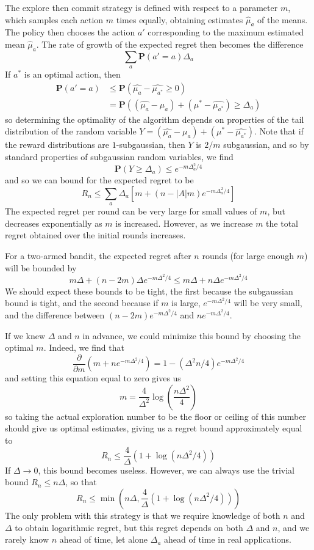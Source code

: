 The explore then commit strategy is defined with respect to a parameter $m$, which samples each action $m$ times equally, obtaining estimates $\widehat{\mu}_a$ of the means. The policy then chooses the action $a'$ corresponding to the maximum estimated mean $\widehat{\mu}_a$. The rate of growth of the expected regret then becomes the difference
%
\[ \sum_a \mathbf{P}(a' = a) \Delta_a \]
%
If $a^*$ is an optimal action, then
%
\begin{align*}
    \mathbf{P}(a' = a) &\leq \mathbf{P}(\widehat{\mu_a} - \widehat{\mu_{a^*}} \geq 0)\\
    &= \mathbf{P}((\widehat{\mu_a} - \mu_a) + (\mu^* - \widehat{\mu_{a^*}}) \geq \Delta_a)
\end{align*}
%
so determining the optimality of the algorithm depends on properties of the tail distribution of the random variable $Y = (\widehat{\mu_a} - \mu_a) + (\mu^* - \widehat{\mu_{a^*}})$. Note that if the reward distributions are $1$-subgaussian, then $Y$ is $2/m$ subgaussian, and so by standard properties of subgaussian random variables, we find
%
\[ \mathbf{P}(Y \geq \Delta_a) \leq e^{-m\Delta_a^2/4} \]
%
and so we can bound for the expected regret to be
%
\[ R_n \leq \sum_a \Delta_a \left[ m + (n - |A|m)e^{-m\Delta_a^2/4} \right] \]
%
The expected regret per round can be very large for small values of $m$, but decreases exponentially as $m$ is increased. However, as we increase $m$ the total regret obtained over the initial rounds increases.

For a two-armed bandit, the expected regret after $n$ rounds (for large enough $m$) will be bounded by
%
\[ m \Delta + (n - 2m) \Delta e^{-m \Delta^2/4} \leq m \Delta + n \Delta e^{-m \Delta^2/4} \]
%
We should expect these bounds to be tight, the first because the subgaussian bound is tight, and the second because if $m$ is large, $e^{-m \Delta^2/4}$ will be very small, and the difference between $(n - 2m) e^{-m \Delta^2/4}$ and $ne^{-m \Delta^2/4}$.

If we knew $\Delta$ and $n$ in advance, we could minimize this bound by choosing the optimal $m$. Indeed, we find that
%
\[ \frac{\partial}{\partial m}(m + n e^{-m \Delta^2/4}) = 1 - (\Delta^2 n/4) e^{-m \Delta^2/4} \]
%
and setting this equation equal to zero gives us
%
\[ m = \frac{4}{\Delta^2} \log \left(\frac{n \Delta^2}{4} \right) \]
%
so taking the actual exploration number to be the floor or ceiling of this number should give us optimal estimates, giving us a regret bound approximately equal to
%
\[ R_n \leq \frac{4}{\Delta} (1 + \log(n\Delta^2/4)) \]
%
If $\Delta \to 0$, this bound becomes useless. However, we can always use the trivial bound $R_n \leq n \Delta$, so that
%
\[ R_n \leq \min \left( n \Delta, \frac{4}{\Delta} (1 + \log(n \Delta^2/4)) \right) \]
%
The only problem with this strategy is that we require knowledge of both $n$ and $\Delta$ to obtain logarithmic regret, but this regret depends on both $\Delta$ and $n$, and we rarely know $n$ ahead of time, let alone $\Delta_a$ ahead of time in real applications.

